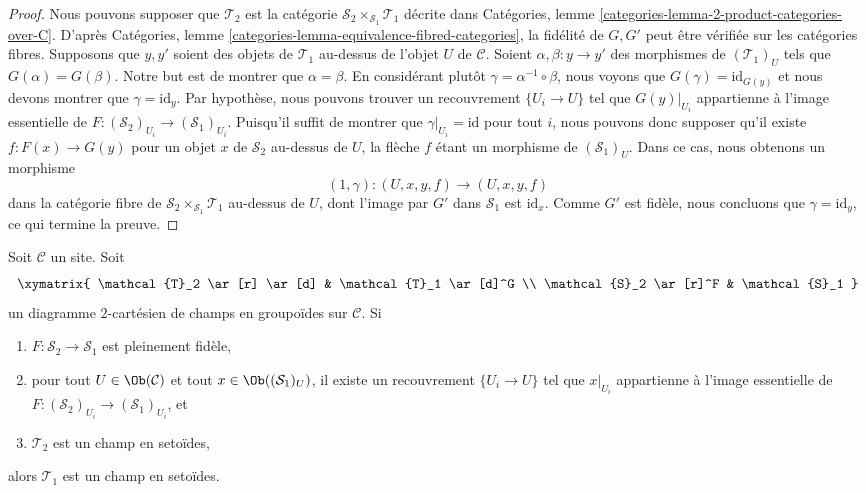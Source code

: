 \begin{proof}
Nous pouvons supposer que $\mathcal{T}_2$ est la catégorie
$\mathcal{S}_2 \times_{\mathcal{S}_1} \mathcal{T}_1$
décrite dans
Catégories, lemme \ref{categories-lemma-2-product-categories-over-C}.
D'après
Catégories, lemme \ref{categories-lemma-equivalence-fibred-categories},
la fidélité de $G, G'$ peut être vérifiée sur les catégories fibres.
Supposons que $y, y'$ soient des objets de $\mathcal{T}_1$ au-dessus de l'objet $U$
de $\mathcal{C}$. Soient $\alpha, \beta : y \to y'$ des morphismes de
$(\mathcal{T}_1)_U$ tels que $G(\alpha) = G(\beta)$. Notre but est de
montrer que $\alpha = \beta$. En considérant plutôt
$\gamma = \alpha^{-1} \circ \beta$, nous voyons que $G(\gamma) = \text{id}_{G(y)}$
et nous devons montrer que $\gamma = \text{id}_y$. Par hypothèse, nous
pouvons trouver un recouvrement $\{U_i \to U\}$ tel que $G(y)|_{U_i}$ appartienne à
l'image essentielle de $F :(\mathcal{S}_2)_{U_i} \to (\mathcal{S}_1)_{U_i}$.
Puisqu'il suffit de montrer que $\gamma|_{U_i} = \text{id}$ pour tout $i$,
nous pouvons donc supposer qu'il existe
$f : F(x) \to G(y)$ pour un objet $x$ de $\mathcal{S}_2$ au-dessus de $U$,
la flèche $f$ étant un morphisme de $(\mathcal{S}_1)_U$. Dans ce cas, nous obtenons
un morphisme
$$
(1, \gamma) : (U, x, y, f) \longrightarrow (U, x, y, f)
$$
dans la catégorie fibre de $\mathcal{S}_2 \times_{\mathcal{S}_1} \mathcal{T}_1$
au-dessus de $U$, dont l'image par $G'$ dans $\mathcal{S}_1$ est $\text{id}_x$.
Comme $G'$ est fidèle, nous concluons que $\gamma = \text{id}_y$, ce qui termine la preuve.
\end{proof}

\begin{lemma}
\label{lemma-stack-in-setoids-descent}
Soit $\mathcal{C}$ un site.
Soit
$$
\xymatrix{
\mathcal{T}_2 \ar[r] \ar[d] & \mathcal{T}_1 \ar[d]^G \\
\mathcal{S}_2 \ar[r]^F & \mathcal{S}_1
}
$$
un diagramme $2$-cartésien de champs en groupoïdes sur $\mathcal{C}$.
Si
\begin{enumerate}
\item $F : \mathcal{S}_2 \to \mathcal{S}_1$ est pleinement fidèle,
\item pour tout $U \in \Ob(\mathcal{C})$ et tout
$x \in \Ob((\mathcal{S}_1)_U)$, il existe un recouvrement
$\{U_i \to U\}$ tel que $x|_{U_i}$ appartienne à l'image essentielle
de $F : (\mathcal{S}_2)_{U_i} \to (\mathcal{S}_1)_{U_i}$, et
\item $\mathcal{T}_2$ est un champ en setoïdes,
\end{enumerate}
alors $\mathcal{T}_1$ est un champ en setoïdes.
\end{lemma}

